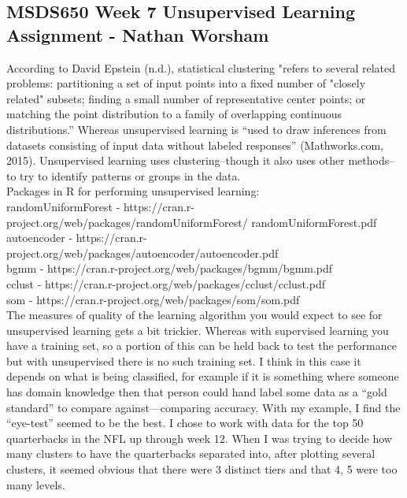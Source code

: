 \documentclass[10pt]{article}
\begin{document}
\subsection*{MSDS650 Week 7 Unsupervised Learning Assignment - Nathan Worsham}
According to David Epstein (n.d.), statistical clustering "refers to several related problems: partitioning a set of input points into a fixed number of "closely related" subsets; finding a small number of representative center points; or matching the point distribution to a family of overlapping continuous distributions.” Whereas unsupervised learning is “used to draw inferences from datasets consisting of input data without labeled responses” (Mathworks.com, 2015). Unsupervised learning uses clustering--though it also uses other methods--to try to identify patterns or groups in the data.\\
Packages in R for performing unsupervised learning:\\
randomUniformForest - https://cran.r-project.org/web/packages/randomUniformForest/
randomUniformForest.pdf\\
autoencoder - https://cran.r-project.org/web/packages/autoencoder/autoencoder.pdf\\
bgmm - https://cran.r-project.org/web/packages/bgmm/bgmm.pdf\\
cclust - https://cran.r-project.org/web/packages/cclust/cclust.pdf\\
som - https://cran.r-project.org/web/packages/som/som.pdf\\
The measures of quality of the learning algorithm you would expect to see for unsupervised learning gets a bit trickier. Whereas with supervised learning you have a training set, so a portion of this can be held back to test the performance but with unsupervised there is no such training set. I think in this case it depends on what is being classified, for example if it is something where someone has domain knowledge then that person could hand label some data as a “gold standard” to compare against—comparing accuracy. With my example, I find the “eye-test” seemed to be the best. I chose to work with data for the top 50 quarterbacks in the NFL up through week 12. When I was trying to decide how many clusters to have the quarterbacks separated into, after plotting several clusters, it seemed obvious that there were 3 distinct tiers and that 4, 5 were too many levels.\\
\end{document}
